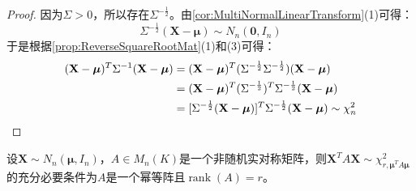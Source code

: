 \begin{proof}
	因为$\Sigma>0$，所以存在$\Sigma^{-\frac{1}{2}}$。由\cref{cor:MultiNormalLinearTransform}(1)可得：
	\begin{equation*}
		\Sigma^{-\frac{1}{2}}(\mathbf{X}-\boldsymbol{\mu})\sim N_n(\mathbf{0},I_n)
	\end{equation*}
	于是根据\cref{prop:ReverseSquareRootMat}(1)和(3)可得：
	\begin{align*}
		(\mathbf{X}-\boldsymbol{\mu})^T\Sigma^{-1}(\mathbf{X}-\boldsymbol{\mu})&=(\mathbf{X}-\boldsymbol{\mu})^T(\Sigma^{-\frac{1}{2}}\Sigma^{-\frac{1}{2}})(\mathbf{X}-\boldsymbol{\mu}) \\
		&=(\mathbf{X}-\boldsymbol{\mu})^T(\Sigma^{-\frac{1}{2}})^T\Sigma^{-\frac{1}{2}}(\mathbf{X}-\boldsymbol{\mu}) \\
		&=[\Sigma^{-\frac{1}{2}}(\mathbf{X}-\boldsymbol{\mu})]^T\Sigma^{-\frac{1}{2}}(\mathbf{X}-\boldsymbol{\mu})\sim\chi_n^2\qedhere
	\end{align*}
\end{proof}
\begin{theorem}\label{theo:XAXChi2}
	设$\mathbf{X}\sim N_n(\boldsymbol{\mu},I_n)$，$A\in M_{n}(K)$是一个非随机实对称矩阵，则$\mathbf{X}^TA\mathbf{X}\sim\chi_{r,\boldsymbol{\mu}^TA\boldsymbol{\mu}}^2$的充分必要条件为$A$是一个幂等阵且$\operatorname{rank}(A)=r$。
\end{theorem}

